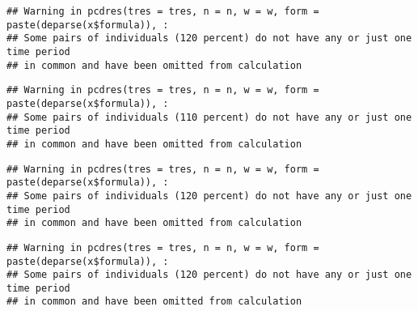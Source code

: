 \documentclass[a4paper,nobind]{templates/ociamthesis}
\newenvironment{Shaded}{\begin{snugshade}}{\end{snugshade}}
\newcommand{\DocumentationTok}[1]{\textcolor[rgb]{0.56,0.35,0.01}{\textbf{\textit{#1}}}}
\newcommand{\FunctionTok}[1]{\textcolor[rgb]{0.00,0.00,0.00}{#1}}
\newcommand{\NormalTok}[1]{#1}
\newcommand{\OtherTok}[1]{\textcolor[rgb]{0.56,0.35,0.01}{#1}}
\newcommand{\SpecialCharTok}[1]{\textcolor[rgb]{0.00,0.00,0.00}{#1}}
\renewenvironment{Shaded}
{
  \vspace{10pt}%
  \begin{snugshade}%
}{%
  \end{snugshade}%
  \vspace{8pt}%
}
\begin{document}
\begin{verbatim}
## Warning in pcdres(tres = tres, n = n, w = w, form = paste(deparse(x$formula)), :
## Some pairs of individuals (120 percent) do not have any or just one time period
## in common and have been omitted from calculation
\end{verbatim}

\begin{Shaded}
\end{Shaded}

\begin{verbatim}
## Warning in pcdres(tres = tres, n = n, w = w, form = paste(deparse(x$formula)), :
## Some pairs of individuals (110 percent) do not have any or just one time period
## in common and have been omitted from calculation
\end{verbatim}

\begin{Shaded}
\end{Shaded}

\begin{verbatim}
## Warning in pcdres(tres = tres, n = n, w = w, form = paste(deparse(x$formula)), :
## Some pairs of individuals (120 percent) do not have any or just one time period
## in common and have been omitted from calculation
\end{verbatim}

\begin{Shaded}
\end{Shaded}

\begin{verbatim}
## Warning in pcdres(tres = tres, n = n, w = w, form = paste(deparse(x$formula)), :
## Some pairs of individuals (120 percent) do not have any or just one time period
## in common and have been omitted from calculation
\end{verbatim}
\end{document}
